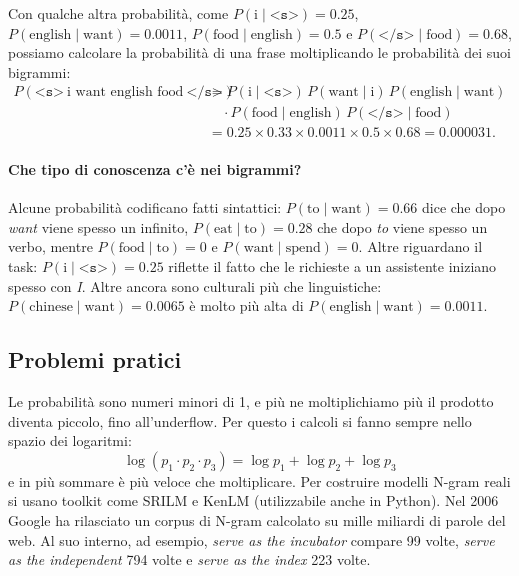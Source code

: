Con qualche altra probabilità, come $P(\text{i} \mid \texttt{<s>}) = 0.25$, $P(\text{english} \mid \text{want}) = 0.0011$, $P(\text{food} \mid \text{english}) = 0.5$ e $P(\texttt{</s>} \mid \text{food}) = 0.68$, possiamo calcolare la probabilità di una frase moltiplicando le probabilità dei suoi bigrammi:
\begin{align*}
P(\texttt{<s>}\ \text{i want english food}\ \texttt{</s>}) &= P(\text{i} \mid \texttt{<s>})\, P(\text{want} \mid \text{i})\, P(\text{english} \mid \text{want}) \\
&\quad \cdot P(\text{food} \mid \text{english})\, P(\texttt{</s>} \mid \text{food}) \\
&= 0.25 \times 0.33 \times 0.0011 \times 0.5 \times 0.68 = 0.000031.
\end{align*}

\paragraph{Che tipo di conoscenza c'è nei bigrammi?} Alcune probabilità codificano fatti sintattici: $P(\text{to} \mid \text{want}) = 0.66$ dice che dopo \textit{want} viene spesso un infinito, $P(\text{eat} \mid \text{to}) = 0.28$ che dopo \textit{to} viene spesso un verbo, mentre $P(\text{food} \mid \text{to}) = 0$ e $P(\text{want} \mid \text{spend}) = 0$. Altre riguardano il task: $P(\text{i} \mid \texttt{<s>}) = 0.25$ riflette il fatto che le richieste a un assistente iniziano spesso con \textit{I}. Altre ancora sono culturali più che linguistiche: $P(\text{chinese} \mid \text{want}) = 0.0065$ è molto più alta di $P(\text{english} \mid \text{want}) = 0.0011$.

\subsection{Problemi pratici}
Le probabilità sono numeri minori di 1, e più ne moltiplichiamo più il prodotto diventa piccolo, fino all'underflow. Per questo i calcoli si fanno sempre nello spazio dei logaritmi:
\[
\log(p_1 \cdot p_2 \cdot p_3) = \log p_1 + \log p_2 + \log p_3
\]
e in più sommare è più veloce che moltiplicare. Per costruire modelli N-gram reali si usano toolkit come SRILM e KenLM (utilizzabile anche in Python). Nel 2006 Google ha rilasciato un corpus di N-gram calcolato su mille miliardi di parole del web. Al suo interno, ad esempio, \textit{serve as the incubator} compare 99 volte, \textit{serve as the independent} 794 volte e \textit{serve as the index} 223 volte.

